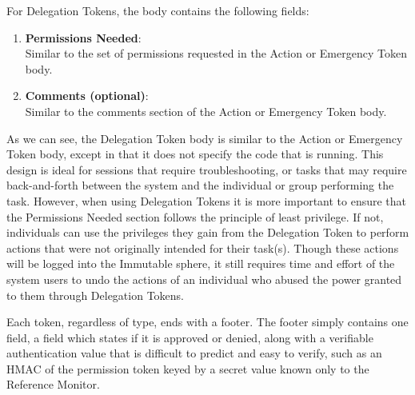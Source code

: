 For Delegation Tokens, the body contains the following fields:
\begin{enumerate}
\item \textbf{Permissions Needed}:\\
Similar to the set of permissions requested in the Action or Emergency Token
body.
\item \textbf{Comments (optional)}:\\
Similar to the comments section of the Action or Emergency Token body.
\end{enumerate}

As we can see, the Delegation Token body is similar to the Action or Emergency
Token body, except in that it does not specify the code that is running. This
design is ideal for sessions that require troubleshooting, or tasks that may
require back-and-forth between the system and the individual or group performing
the task. However, when using Delegation Tokens it is
more important to ensure that the Permissions Needed section follows the
principle of least privilege. If not, individuals can use the privileges they
gain from the Delegation Token to perform actions that were not originally
intended for their task(s). Though these actions will be logged into the
Immutable sphere, it still requires time and effort of the system users to undo
the actions of an individual who abused the power granted to them through
Delegation Tokens.

Each token, regardless of type, ends with a footer. The footer simply contains
one field, a field which states if it is approved or denied, along with a
verifiable authentication value that is difficult to predict and easy to verify,
such as an HMAC of the permission token keyed by a secret value known only to
the Reference Monitor.

